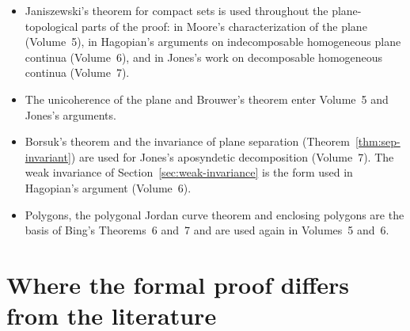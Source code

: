 \begin{itemize}
\item Janiszewski's theorem for compact sets is used throughout the plane-topological parts of the
proof: in Moore's characterization of the plane (Volume~5), in Hagopian's arguments on
indecomposable homogeneous plane continua (Volume~6), and in Jones's work on decomposable
homogeneous continua (Volume~7).
\item The unicoherence of the plane and Brouwer's theorem enter Volume~5 and Jones's arguments.
\item Borsuk's theorem and the invariance of plane separation (Theorem~\ref{thm:sep-invariant}) are
used for Jones's aposyndetic decomposition (Volume~7). The weak invariance of
Section~\ref{sec:weak-invariance} is the form used in Hagopian's argument (Volume~6).
\item Polygons, the polygonal Jordan curve theorem and enclosing polygons are the basis of Bing's
Theorems~6 and~7 and are used again in Volumes~5 and~6.
\end{itemize}

\section{Where the formal proof differs from the literature}\label{sec:intro-diff}

